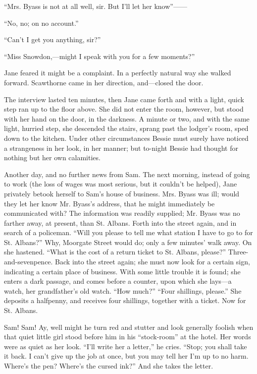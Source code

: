 ``Mrs. Byass is not at all well, sir. But I'll let her know''{{------}}

``No, no; on no account.''

``Can't I get you anything, sir?''

{}``Miss Snowdon,---might I speak with you for a few moments?''

Jane feared it might be a complaint. In a perfectly natural way she
walked forward. Scawthorne came in her direction, and---closed the door.

The interview lasted ten minutes, then Jane came forth and with a light,
quick step ran up to the floor above. She did not enter the room,
however, but stood with her hand on the door, in the darkness. A minute
or two, and with the same light, hurried step, she descended the stairs,
sprang past the lodger's room, sped down to the kitchen. Under other
circumstances Bessie must surely have noticed a strangeness in her look,
in her manner; but to-night Bessie had thought for nothing but her own
calamities.

Another day, and no further news from Sam. The next morning, instead of
going to work (the loss of wages was most serious, but it couldn't be
helped), Jane privately betook herself to Sam's house of business. Mrs.
Byass was ill; would they let her know Mr. Byass's address, that he
might immediately be communicated with? The information was {}readily
supplied; Mr. Byass was no farther away, at present, than St. Albans.
Forth into the street again, and in search of a policeman. ``Will you
please to tell me what station I have to go to for St. Albans?'' Why,
Moorgate Street would do; only a few minutes' walk away. On she
hastened. ``What is the cost of a return ticket to St. Albans, please?''
Three-and-sevenpence. Back into the street again; she must now look for
a certain sign, indicating a certain place of business. With some little
trouble it is found; she enters a dark passage, and comes before a
counter, upon which she lays---a watch, her grandfather's old watch.
``How much?'' ``Four shillings, please.'' She deposits a halfpenny, and
receives four shillings, together with a ticket. Now for St. Albans.

Sam! Sam! Ay, well might he turn red and stutter and look generally
foolish when that quiet little girl stood before him in his
``stock-room'' at the hotel. Her words were as quiet as her look. ``I'll
write her a letter,'' he cries. ``Stop; you shall take it back. I can't
give up the job at once, but you may tell her I'm up to no harm. Where's
the pen? {}Where's the cursed ink?'' And she takes the letter.

